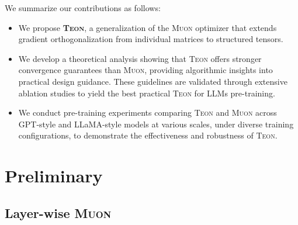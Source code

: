 \documentclass{article}
\theoremstyle{plain}
\theoremstyle{definition}
\theoremstyle{remark}
\begin{document}
We summarize our contributions as follows:
\begin{itemize}
    \item We propose \textbf{\textsc{Teon}}, a generalization of the \textsc{Muon} optimizer that extends gradient orthogonalization from individual matrices to structured tensors.
    \item We develop a theoretical analysis showing that \textsc{Teon} offers stronger convergence guarantees than \textsc{Muon}, providing algorithmic insights into practical design guidance. These guidelines are validated through extensive ablation studies to yield the best practical \textsc{Teon} for LLMs pre-training. 
    \item We conduct pre-training experiments comparing \textsc{Teon} and \textsc{Muon} across GPT-style and LLaMA-style models at various scales, under diverse training configurations, to demonstrate the effectiveness and robustness of \textsc{Teon}.
\end{itemize}
\vspace{-10pt}
\section{Preliminary}

\subsection{Layer-wise \textsc{Muon}}
\label{sec:layer-wise-muon}
\end{document}
